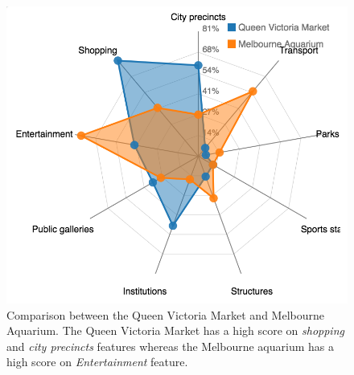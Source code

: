 \begin{figure}[t!]
\includegraphics[width=0.8\linewidth]{figure/sample_radar.png}
\caption{Comparison between the Queen Victoria Market and Melbourne Aquarium. The Queen Victoria Market has a high score on \textit{shopping} and \textit{city precincts} features whereas the Melbourne aquarium has a high score on \textit{Entertainment} feature.}
\label{fig:radar}
\end{figure}